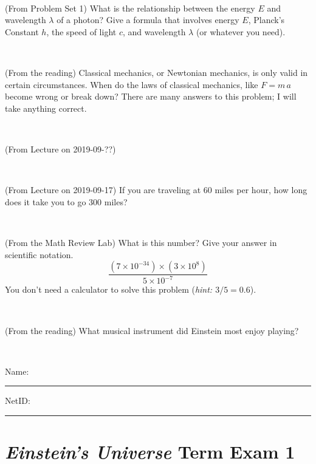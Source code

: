 \documentclass[12pt, letterpaper]{article}
\begin{document}
\vfill ~

\begin{problem} (From Problem Set 1)
What is the relationship between the energy $E$ and wavelength
$\lambda$ of a photon? Give a formula that involves energy $E$,
Planck's Constant $h$, the speed of light $c$, and wavelength
$\lambda$ (or whatever you need).
\end{problem}

\vfill ~

\begin{problem} (From the reading)
Classical mechanics, or Newtonian mechanics, is only valid in certain
circumstances. When do the laws of classical mechanics, like $F =
m\,a$ become wrong or break down? There are many answers to this
problem; I will take anything correct.
\end{problem}


\vfill ~


\clearpage


\begin{problem} (From Lecture on 2019-09-??)
\end{problem}


\vfill ~

\begin{problem} (From Lecture on 2019-09-17)
If you are traveling at 60 miles per hour, how long does
it take you to go 300 miles?
\end{problem}


\vfill ~

\begin{problem} (From the Math Review Lab)
What is this number? Give your answer in scientific notation.
$$
\frac{(7\times10^{-34})\times(3\times10^8)}{5\times10^{-7}}
$$
You don't need a calculator to solve this problem (\textit{hint: $3/5=0.6$}).
\end{problem}


\vfill ~

\begin{problem} (From the reading)
What musical instrument did Einstein most enjoy playing?
\end{problem}


\vfill ~


\cleardoublepage



\noindent
Name: \rule[-1ex]{0.60\textwidth}{0.1pt}
NetID: \rule[-1ex]{0.20\textwidth}{0.1pt}

\section*{\textsl{Einstein's Universe} Term Exam 1}
\setcounter{problem}{1}
\end{document}
